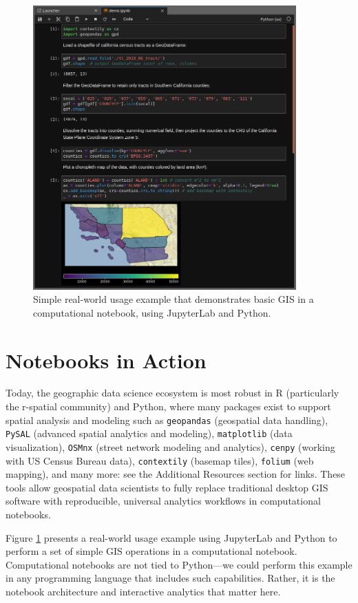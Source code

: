 \documentclass[11pt,letterpaper]{article}
\begin{document}
\begin{figure}[!bt]
	\centering
	\includegraphics[width=0.9\textwidth]{code-demo.png}
	\caption{Simple real-world usage example that demonstrates basic GIS in a computational notebook, using JupyterLab and Python.}
	\label{fig:code_demo}
\end{figure}

\section{Notebooks in Action}

Today, the geographic data science ecosystem is most robust in R (particularly the r-spatial community) and Python, where many packages exist to support spatial analysis and modeling such as \texttt{geopandas} (geospatial data handling), \texttt{PySAL} (advanced spatial analytics and modeling), \texttt{matplotlib} (data visualization), \texttt{OSMnx}  (street network modeling and analytics), \texttt{cenpy} (working with US Census Bureau data), \texttt{contextily} (basemap tiles), \texttt{folium} (web mapping), and many more: see the Additional Resources section for links. These tools allow geospatial data scientists to fully replace traditional desktop GIS software with reproducible, universal analytics workflows in computational notebooks.

Figure \ref{fig:code_demo} presents a real-world usage example using JupyterLab and Python to perform a set of simple GIS operations in a computational notebook. Computational notebooks are not tied to Python---we could perform this example in any programming language that includes such capabilities. Rather, it is the notebook architecture and interactive analytics that matter here.
\end{document}
